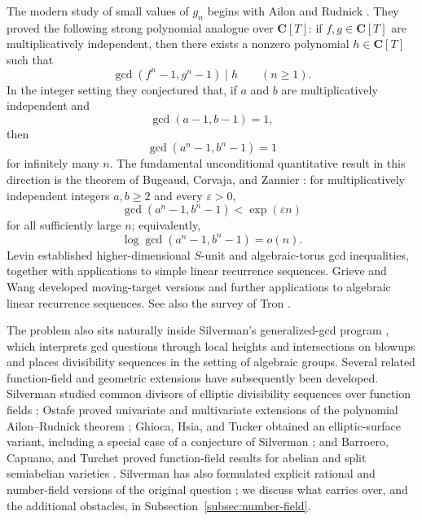 \documentclass[11pt]{amsart}
\theoremstyle{remark}
\numberwithin{equation}{section}
\begin{document}
The modern study of small values of $g_n$ begins with Ailon and Rudnick
\cite{AR04}.  They proved the following strong polynomial analogue over
$\mathbf C[T]$: if $f,g\in\mathbf C[T]$ are multiplicatively independent, then
there exists a nonzero polynomial $h\in\mathbf C[T]$ such that
\[
  \gcd(f^n-1,g^n-1)\mid h
  \qquad(n\ge 1).
\]
In the integer setting they conjectured that, if $a$ and $b$ are
multiplicatively independent and
\[
  \gcd(a-1,b-1)=1,
\]
then
\[
  \gcd(a^n-1,b^n-1)=1
\]
for infinitely many $n$.  The fundamental unconditional quantitative result in
this direction is the theorem of Bugeaud, Corvaja, and Zannier \cite{BCZ03}:
for multiplicatively independent integers $a,b\ge 2$ and every
$\varepsilon>0$,
\[
  \gcd(a^n-1,b^n-1)<\exp(\varepsilon n)
\]
for all sufficiently large $n$; equivalently,
\[
  \log \gcd(a^n-1,b^n-1)=o(n).
\]
Levin \cite{Lev19} established higher-dimensional $S$-unit and algebraic-torus
gcd inequalities, together with applications to simple linear recurrence
sequences.  Grieve and Wang \cite{GW20} developed moving-target versions and
further applications to algebraic linear recurrence sequences.  See also the
survey of Tron \cite{Tron20}.

The problem also sits naturally inside Silverman's generalized-gcd program
\cite{Sil05}, which interprets gcd questions through local heights and
intersections on blowups and places divisibility sequences in the setting of
algebraic groups.  Several related function-field and geometric extensions have
subsequently been developed.  Silverman studied common divisors of elliptic
divisibility sequences over function fields \cite{Sil04}; Ostafe proved
univariate and multivariate extensions of the polynomial Ailon--Rudnick theorem
\cite{Ost16}; Ghioca, Hsia, and Tucker obtained an elliptic-surface variant,
including a special case of a conjecture of Silverman \cite{GHT18}; and
Barroero, Capuano, and Turchet proved function-field results for abelian and
split semiabelian varieties \cite{BCT24}.  Silverman has also formulated
explicit rational and number-field versions of the original question
\cite{Sil20}; we discuss what carries over, and the additional obstacles, in
Subsection~\ref{subsec:number-field}.
\end{document}
